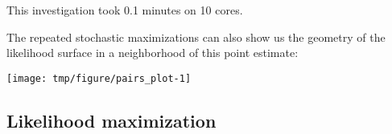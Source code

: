 \begin{frame}[fragile]

\bi

\item This investigation took  0.1 minutes on 10 cores. 

\item The repeated stochastic maximizations can also show us the geometry of the likelihood surface in a neighborhood of this point estimate:

\ei

\begin{knitrout}\small
{}\color{fgcolor}\begin{kframe}
\begin{alltt}
\hldef{(}\hlopt{~}\hlopt{+}\hlopt{+}\hlopt{+}\hlopt{+}
  \hldef{=}\hlopt{>}\hlopt{-}\hldef{))}
\end{alltt}
\end{kframe}
\end{knitrout}

\vspace{-5mm}

\begin{knitrout}\small
{}\color{fgcolor}

{\centering \texttt{[image: tmp/figure/pairs\_plot-1]} 

}


\end{knitrout}

\end{frame}

\subsection{Likelihood maximization}

